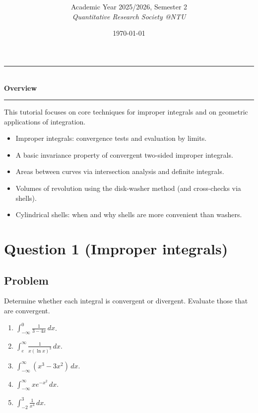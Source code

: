 \documentclass[12pt]{article}
\title{
\CourseCode \CourseName \\[0.3em]
\large \DocType
}
\author{
  Academic Year 2025/2026, Semester 2 \\[0.25em]
  \textit{Quantitative Research Society @NTU}
}
\date{\today}
\begin{document}
\maketitle
\thispagestyle{plainfirst}
\pagestyle{main}

\bigskip


\begin{center}
\rule{0.8\textwidth}{0.4pt}\\[4pt]
\textbf{Overview} \\[2pt]
\rule{0.8\textwidth}{0.4pt}
\end{center}

\noindent
This tutorial focuses on core techniques for improper integrals and on geometric applications of integration.

\begin{itemize}[leftmargin=*]
\item Improper integrals: convergence tests and evaluation by limits.
\item A basic invariance property of convergent two-sided improper integrals.
\item Areas between curves via intersection analysis and definite integrals.
\item Volumes of revolution using the disk-washer method (and cross-checks via shells).
\item Cylindrical shells: when and why shells are more convenient than washers.
\end{itemize}

\bigskip

\newpage


\section*{Question 1 (Improper integrals)}

\subsection*{Problem}
Determine whether each integral is convergent or divergent. Evaluate those that are convergent.
\begin{enumerate}[label=(\alph*)]
\item \(\displaystyle \int_{-\infty}^{0} \frac{1}{3-4x}\,dx\).
\item \(\displaystyle \int_{e}^{\infty} \frac{1}{x(\ln x)^3}\,dx\).
\item \(\displaystyle \int_{-\infty}^{\infty} (x^3-3x^2)\,dx\).
\item \(\displaystyle \int_{-\infty}^{\infty} x e^{-x^2}\,dx\).
\item \(\displaystyle \int_{-2}^{3} \frac{1}{x^4}\,dx\).
\end{enumerate}
\end{document}
